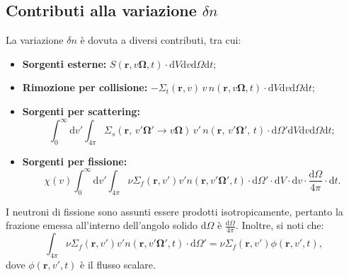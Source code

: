 \subsection{Contributi alla variazione $\delta n$}
La variazione $\delta n$ è dovuta a diversi contributi, tra cui:
\begin{itemize}[nosep, leftmargin=*]
	\item \textbf{Sorgenti esterne:} $S(\mathbf{r}, v\boldsymbol{\Omega}, t) \cdot \mathrm{d}V  \mathrm{d}v  \mathrm{d}\Omega  \mathrm{d}t$;
	\item \textbf{Rimozione per collisione:} $-\Sigma_t(\mathbf{r}, v)\, v\, n(\mathbf{r}, v\boldsymbol{\Omega}, t) \cdot \mathrm{d}V  \mathrm{d}v  \mathrm{d}\Omega  \mathrm{d}t$;
	\item \textbf{Sorgenti per scattering:}
	\begin{equation}
		\int_{0}^{\infty} \mathrm{d}v' \int_{4\pi} \Sigma_s(\mathbf{r},\, v'\boldsymbol{\Omega}' \rightarrow v\boldsymbol{\Omega})\, v'\, n(\mathbf{r},\, v'\boldsymbol{\Omega}',\, t) \cdot \mathrm{d}\Omega'  \mathrm{d}V  \mathrm{d}v  \mathrm{d}\Omega  \mathrm{d}t;
	\end{equation}
	\item \textbf{Sorgenti per fissione:}
	\begin{equation}
		\chi(v) \int_{0}^{\infty} \mathrm{d}v' \int_{4\pi} \nu \Sigma_f(\mathbf{r}, v') v' n(\mathbf{r}, v'\boldsymbol{\Omega}', t) \cdot \mathrm{d}\Omega' \cdot \mathrm{d}V \cdot \mathrm{d}v \cdot \frac{\mathrm{d}\Omega}{4\pi} \cdot \mathrm{d}t.
	\end{equation}
\end{itemize}

I neutroni di fissione sono assunti essere prodotti isotropicamente, pertanto la frazione emessa all'interno dell'angolo solido $\mathrm{d}\Omega$ è $\frac{\mathrm{d}\Omega}{4\pi}$. Inoltre, si noti che:
\begin{equation}
	\int_{4\pi} \nu \Sigma_f(\mathbf{r}, v') v' n(\mathbf{r}, v'\boldsymbol{\Omega}', t) \cdot \mathrm{d}\Omega' = \nu \Sigma_f(\mathbf{r}, v') \phi(\mathbf{r}, v', t),
\end{equation}
dove $\phi(\mathbf{r}, v', t)$ è il flusso scalare.


